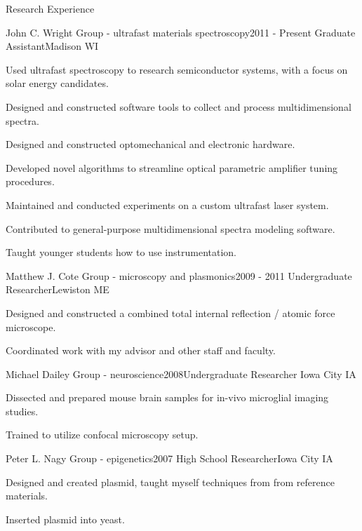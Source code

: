 \documentclass{resume}  %
\begin{document}
\begin{rSection}{Research Experience}
  \begin{rSubsection}{John C. Wright Group - ultrafast materials spectroscopy}{2011 - Present}
    {Graduate Assistant}{Madison WI}
    \item Used ultrafast spectroscopy to research semiconductor systems, with a focus on solar
      energy candidates.
    \item Designed and constructed software tools to collect and process multidimensional spectra.
    \item Designed and constructed optomechanical and electronic hardware.
    \item Developed novel algorithms to streamline optical parametric amplifier tuning procedures.
    \item Maintained and conducted experiments on a custom ultrafast laser system.
    \item Contributed to general-purpose multidimensional spectra modeling software.
    \item Taught younger students how to use instrumentation.
  \end{rSubsection}
  \begin{rSubsection}{Matthew J. Cote Group - microscopy and plasmonics}{2009 - 2011}
    {Undergraduate Researcher}{Lewiston ME}
    \item Designed and constructed a combined total internal reflection / atomic force microscope.
    \item Coordinated work with my advisor and other staff and faculty.
  \end{rSubsection}
  \begin{rSubsection}{Michael Dailey Group - neuroscience}{2008}{Undergraduate Researcher}
    {Iowa City IA}
    \item Dissected and prepared mouse brain samples for in-vivo microglial imaging studies.
    \item Trained to utilize confocal microscopy setup.
  \end{rSubsection}
  \begin{rSubsection}{Peter L. Nagy Group - epigenetics}{2007}
    {High School Researcher}{Iowa City IA}
    \item Designed and created plasmid, taught myself techniques from from reference materials.
    \item Inserted plasmid into yeast.
  \end{rSubsection}
\end{rSection}
\end{document}

